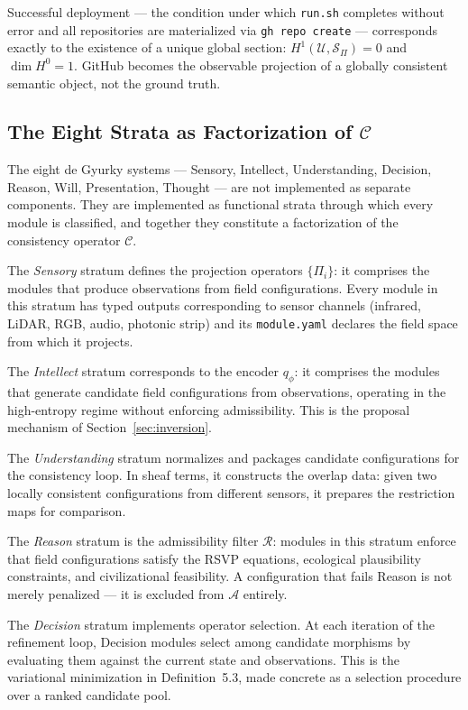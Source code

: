 \documentclass[11pt, oneside]{article}
\begin{document}
Successful deployment --- the condition under which \texttt{run.sh} completes without
error and all repositories are materialized via \texttt{gh repo create} --- corresponds
exactly to the existence of a unique global section: $H^1(\mathcal{U}, \mathcal{S}_\Pi)
= 0$ and $\dim H^0 = 1$. GitHub becomes the observable projection of a globally
consistent semantic object, not the ground truth.

\subsection{The Eight Strata as Factorization of $\mathcal{C}$}

The eight de Gyurky systems --- Sensory, Intellect, Understanding, Decision, Reason,
Will, Presentation, Thought --- are not implemented as separate components. They are
implemented as functional strata through which every module is classified, and together
they constitute a factorization of the consistency operator $\mathcal{C}$.

The \emph{Sensory} stratum defines the projection operators $\{\Pi_i\}$: it comprises
the modules that produce observations from field configurations. Every module in this
stratum has typed outputs corresponding to sensor channels (infrared, LiDAR, RGB, audio,
photonic strip) and its \texttt{module.yaml} declares the field space from which it
projects.

The \emph{Intellect} stratum corresponds to the encoder $q_\phi$: it comprises the
modules that generate candidate field configurations from observations, operating in the
high-entropy regime without enforcing admissibility. This is the proposal mechanism of
Section~\ref{sec:inversion}.

The \emph{Understanding} stratum normalizes and packages candidate configurations for
the consistency loop. In sheaf terms, it constructs the overlap data: given two locally
consistent configurations from different sensors, it prepares the restriction maps for
comparison.

The \emph{Reason} stratum is the admissibility filter $\mathcal{R}$: modules in this
stratum enforce that field configurations satisfy the RSVP equations, ecological
plausibility constraints, and civilizational feasibility. A configuration that fails
Reason is not merely penalized --- it is excluded from $\mathcal{A}$ entirely.

The \emph{Decision} stratum implements operator selection. At each iteration of the
refinement loop, Decision modules select among candidate morphisms by evaluating them
against the current state and observations. This is the variational minimization in
Definition~5.3, made concrete as a selection procedure over a ranked candidate pool.
\end{document}
